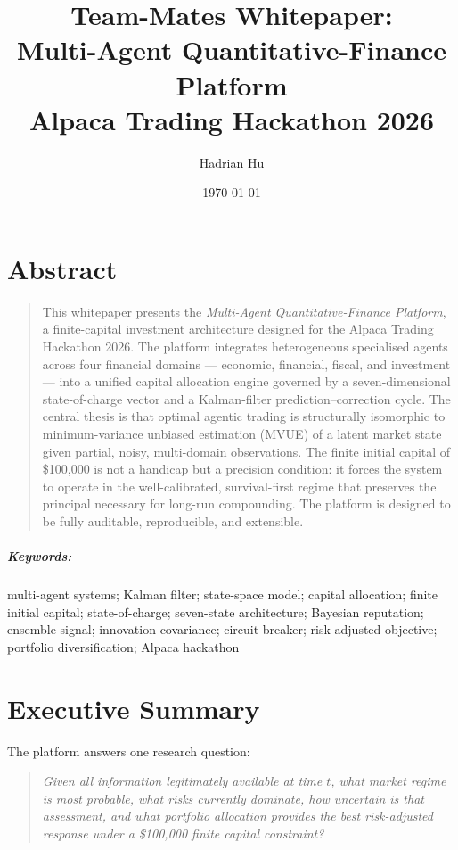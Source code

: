 \documentclass[12pt,openany]{book}
\title{Team-Mates Whitepaper:\\
Multi-Agent Quantitative-Finance Platform\\[0.6em]
{\large Alpaca Trading Hackathon 2026}}
\author{Hadrian Hu}
\date{\today}
\numberwithin{equation}{chapter}
\theoremstyle{plain}
\theoremstyle{definition}
\theoremstyle{remark}
\newenvironment{abstract}{%
  \chapter*{Abstract}
  \begin{quote}\small
}{%
  \end{quote}
}
\newenvironment{keywords}{%
  \paragraph*{Keywords:}
}{}
\begin{document}
\maketitle

\tableofcontents
\listoftheorems[ignoreall,show={theorem,lemma,proposition,corollary,definition,axiom,assumption,conjecture}]

\begin{abstract}
This whitepaper presents the \emph{Multi-Agent Quantitative-Finance
Platform}, a finite-capital investment architecture designed for
the Alpaca Trading Hackathon 2026.  The platform integrates
heterogeneous specialised agents across four financial domains ---
economic, financial, fiscal, and investment --- into a unified
capital allocation engine governed by a seven-dimensional
state-of-charge vector and a Kalman-filter prediction--correction
cycle.  The central thesis is that optimal agentic trading is
structurally isomorphic to minimum-variance unbiased estimation
(MVUE) of a latent market state given partial, noisy, multi-domain
observations.  The finite initial capital of \$100{,}000 is not a
handicap but a precision condition: it forces the system to operate
in the well-calibrated, survival-first regime that preserves the
principal necessary for long-run compounding.  The platform is
designed to be fully auditable, reproducible, and extensible.
\end{abstract}

\begin{keywords}
multi-agent systems; Kalman filter; state-space model; capital
allocation; finite initial capital; state-of-charge; seven-state
architecture; Bayesian reputation; ensemble signal; innovation
covariance; circuit-breaker; risk-adjusted objective; portfolio
diversification; Alpaca hackathon
\end{keywords}

\chapter*{Executive Summary}

\noindent
The platform answers one research question:

\begin{quote}
\emph{Given all information legitimately available at time $t$,
what market regime is most probable, what risks currently dominate,
how uncertain is that assessment, and what portfolio allocation
provides the best risk-adjusted response under a \$100{,}000 finite
capital constraint?}
\end{quote}
\end{document}
